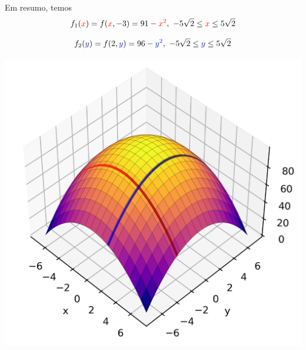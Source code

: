 \begin{frame}
	Em resumo, temos
	\[f_1({\color{red}x})=f({\color{red}x},-3)=91-{\color{red}x^2}, \ -5\sqrt{2}\leq {\color{red}x}\leq 5\sqrt{2} \]
	
	\[f_2({\color{blue}y})=f(2,{\color{blue}y})=96-{\color{blue}y^2}, \ -5\sqrt{2}\leq {\color{blue}y}\leq 5\sqrt{2} \]
	
	
	\begin{center}
		\includegraphics[scale=0.6]{figuras/der-parc2xy-2.png}
	\end{center}
\end{frame}

